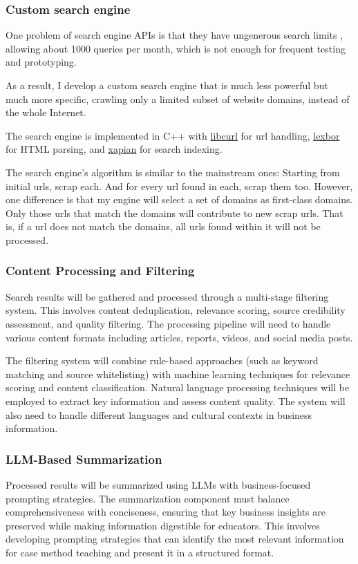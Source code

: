 \documentclass[final-report]{report-template}
\begin{document}
\subsubsection{Custom search engine} 
One problem of search engine APIs is that they have ungenerous search limits
\cite{search.api.limit.1}, allowing about 1000 queries per month, which is not
enough for frequent testing and prototyping.

As a result, I develop a custom search engine that is much less powerful but
much more specific, crawling only a limited subset of website domains, instead
of the whole Internet.

The search engine is implemented in C++ with
\href{https://curl.se/libcurl/}{\ttfamily libcurl} for url handling,
\href{https://lexbor.com/}{\ttfamily lexbor} for HTML parsing, and
\href{https://xapian.org/docs/}{\ttfamily xapian} for search indexing.

The search engine's algorithm is similar to the mainstream ones: Starting from
initial urls, scrap each. And for every url found in each, scrap them too.
However, one difference is that my engine will select a set of domains as
first-class domains. Only those urls that match the domains will contribute to
new scrap urls. That is, if a url does not match the domains, all urls found
within it will not be processed.


\subsubsection{Content Processing and Filtering} Search results will be
gathered and processed through a multi-stage filtering system. This involves
content deduplication, relevance scoring, source credibility assessment, and
quality filtering. The processing pipeline will need to handle various content
formats including articles, reports, videos, and social media posts.

The filtering system will combine rule-based approaches (such as keyword
matching and source whitelisting) with machine learning techniques for
relevance scoring and content classification. Natural language processing
techniques will be employed to extract key information and assess content
quality. The system will also need to handle different languages and cultural
contexts in business information.

\subsubsection{LLM-Based Summarization} Processed results will be summarized
using LLMs with business-focused prompting strategies. The summarization
component must balance comprehensiveness with conciseness, ensuring that key
business insights are preserved while making information digestible for
educators. This involves developing prompting strategies that can identify the
most relevant information for case method teaching and present it in a
structured format.
\end{document}

